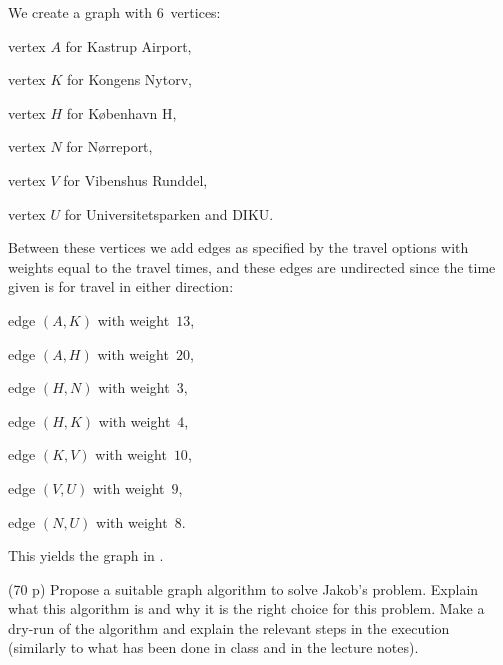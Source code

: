 \documentclass{jn-pset}
\begin{document}
\begin{problem}
\begin{solution}
  We create a graph with $6$~vertices:
  \begin{compactitem}
  \item vertex 
    $A$ for Kastrup Airport, 

  
    
  \item vertex 
    $K$ for Kongens Nytorv,

  \item vertex 
    $H$ for København H,

  \item vertex 
    $N$ for Nørreport,

  \item vertex 
    $V$ for Vibenshus Runddel,

  \item vertex 
    $U$ for Universitetsparken and DIKU.

  \end{compactitem}
%  
  Between these vertices we add edges as specified by the travel options 
  with weights equal to the travel
  times, and these edges are undirected since 
  the time given is for  travel in either direction:
  \begin{compactitem}
  \item edge 
    $(A, K)$ with weight~$13$,
    
  \item edge 
    $(A, H)$ with weight~$20$,
    
  \item edge 
    $(H, N)$ with weight~$3$,
    
  \item edge 
    $(H, K)$ with weight~$4$,

  \item edge 
    $(K, V)$ with weight~$10$,

  \item edge 
    $(V, U)$ with weight~$9$,

  \item edge 
    $(N, U)$ with weight~$8$.
  \end{compactitem}
%
  This yields the graph in
  .
  
\end{solution}


\begin{subproblem}
    {(70 p)}
    {\ignorespaces}
    Propose a suitable graph algorithm to solve Jakob's problem.
    Explain what this algorithm is and why it is the right choice for
    this problem.  Make a dry-run of the algorithm and explain the
    relevant steps in the
%   
    execution (similarly to what has been done in class and in the
    lecture notes).
%       
%   


\end{subproblem}
\end{problem}
\end{document}
